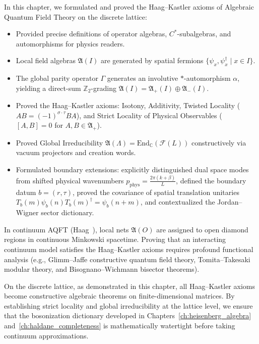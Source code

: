 In this chapter, we formulated and proved the Haag--Kastler axioms of Algebraic Quantum Field Theory on the discrete lattice:
\begin{itemize}
    \item Provided precise definitions of operator algebras, $C^*$-subalgebras, and automorphisms for physics readers.
    \item Local field algebras $\mathfrak{A}(I)$ are generated by spatial fermions $\{\psi_x, \psi_x^\dagger \mid x \in I\}$.
    \item The global parity operator $\Gamma$ generates an involutive $*$-automorphism $\alpha$, yielding a direct-sum $\mathbb{Z}_2$-grading $\mathfrak{A}(I) = \mathfrak{A}_+(I) \oplus \mathfrak{A}_-(I)$.
    \item Proved the Haag--Kastler axioms: Isotony, Additivity, Twisted Locality ($A B = (-1)^{\sigma\cdot\tau} B A$), and Strict Locality of Physical Observables ($[A, B] = 0$ for $A, B \in \mathfrak{A}_+$).
    \item Proved Global Irreducibility $\mathfrak{A}(\Lambda) = \mathrm{End}_{\mathbb{C}}(\mathcal{F}(L))$ constructively via vacuum projectors and creation words.
    \item Formulated boundary extensions: explicitly distinguished dual space modes from shifted physical wavenumbers $p_{\mathrm{phys}} = \frac{2\pi(k+\beta)}{L}$, defined the boundary datum $b = (r, \tau)$, proved the covariance of spatial translation unitaries $T_b(m) \psi_b(n) T_b(m)^\dagger = \psi_b(n+m)$, and contextualized the Jordan--Wigner sector dictionary.
\end{itemize}

\begin{remark}
In continuum AQFT (Haag~\cite{haag1996}), local nets $\mathfrak{A}(O)$ are assigned to open diamond regions in continuous Minkowski spacetime. Proving that an interacting continuum model satisfies the Haag--Kastler axioms requires profound functional analysis (e.g., Glimm--Jaffe constructive quantum field theory, Tomita--Takesaki modular theory, and Bisognano--Wichmann bisector theorems). 

On the discrete lattice, as demonstrated in this chapter, all Haag--Kastler axioms become constructive algebraic theorems on finite-dimensional matrices. By establishing strict locality and global irreducibility at the lattice level, we ensure that the bosonization dictionary developed in Chapters~\ref{ch:heisenberg_algebra} and~\ref{ch:haldane_completeness} is mathematically watertight before taking continuum approximations.
\end{remark}
